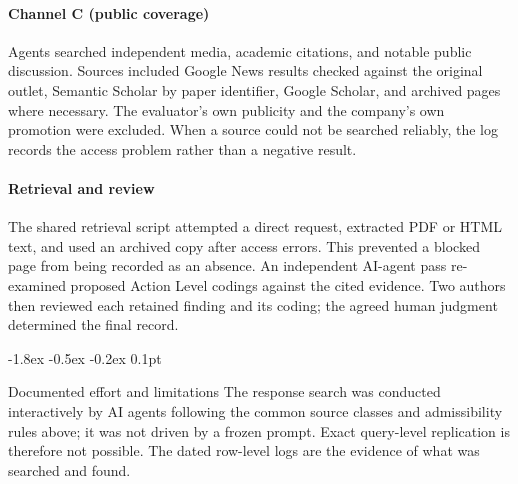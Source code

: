 \documentclass{article}
\makeatletter
\renewcommand{\subsection}{%
  \@startsection{subsection}{2}{\z@}%
                {-1.8ex \@plus -0.5ex \@minus -0.2ex}%
                {0.1pt}%
                {\normalsize\bf\raggedright}%
}
\makeatother
\begin{document}
\paragraph{Channel C (public coverage)}
Agents searched independent media, academic citations, and notable public discussion. Sources included Google News results checked against the original outlet, Semantic Scholar by paper identifier, Google Scholar, and archived pages where necessary. The evaluator's own publicity and the company's own promotion were excluded. When a source could not be searched reliably, the log records the access problem rather than a negative result.

\paragraph{Retrieval and review}
The shared retrieval script attempted a direct request, extracted PDF or HTML text, and used an archived copy after access errors. This prevented a blocked page from being recorded as an absence. An independent AI-agent pass re-examined proposed Action Level codings against the cited evidence. Two authors then reviewed each retained finding and its coding; the agreed human judgment determined the final record.

\subsection{Documented effort and limitations}
The response search was conducted interactively by AI agents following the common source classes and admissibility rules above; it was not driven by a frozen prompt. Exact query-level replication is therefore not possible. The dated row-level logs are the evidence of what was searched and found.
\end{document}
